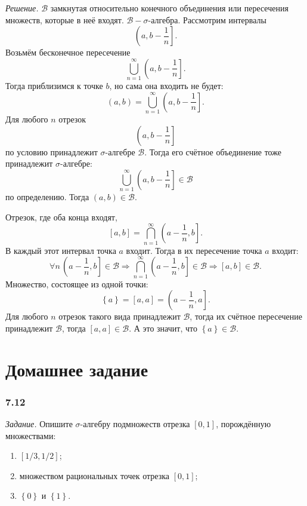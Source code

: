 \textit{Решение.} $ \mathcal{B} $ замкнутая относительно конечного объединения или пересечения множеств, которые в неё входят.
$ \mathcal{B} - \sigma $-алгебра.
Рассмотрим интервалы
$$ \left( a, b - \frac{1}{n} \right].$$
Возьмём бесконечное пересечение
$$ \bigcup \limits_{n=1}^{ \infty } \left( a, b - \frac{1}{n} \right].$$
Тогда приблизимся к точке $b$, но сама она входить не будет:
$$ \left( a, b \right) =
\bigcup \limits_{n=1}^{ \infty } \left( a, b - \frac{1}{n} \right].$$
Для любого $n$ отрезок
$$ \left( a, b - \frac{1}{n} \right] $$
по условию принадлежит $ \sigma $-алгебре $ \mathcal{B}$.
Тогда его счётное объединение тоже принадлежит $ \sigma $-алгебре:
$$ \bigcup \limits_{n=1}^{ \infty } \left( a, b - \frac{1}{n} \right] \in \mathcal{B} $$
по определению.
Тогда $ \left( a, b \right) \in \mathcal{B} $.

Отрезок, где оба конца входят,
$$ \left[ a, b \right] =
\bigcap \limits_{n=1}^{ \infty } \left( a - \frac{1}{n}, b \right].$$
В каждый этот интервал точка $a$ входит.
Тогда в их пересечение точка $a$ входит:
$$ \forall n \,
\left( a - \frac{1}{n}, b \right] \in \mathcal{B} \Rightarrow
\bigcap \limits_{n=1}^{ \infty } \left( a - \frac{1}{n}, b \right] \in \mathcal{B} \Rightarrow
\left[ a, b \right] \in \mathcal{B}.$$
Множество, состоящее из одной точки:
$$ \left\{ a \right\} =
\left[ a, a \right] =
\left( a - \frac{1}{n}, a \right].$$
Для любого $n$ отрезок такого вида принадлежит $ \mathcal{B} $, тогда их счётное пересечение принадлежит $ \mathcal{B} $, тогда $ \left[ a, a \right] \in \mathcal{B} $.
А это значит, что $ \left\{ a \right\} \in \mathcal{B} $.

\section*{Домашнее задание}

\subsubsection*{7.12}

\textit{Задание.} Опишите $ \sigma $-алгебру подмножеств отрезка $ \left[ 0, 1 \right] $, порождённую множествами:
\begin{enumerate}[label=\alph*)]
\item $ \left[ 1/3, 1/2 \right] $;
\item множеством рациональных точек отрезка $ \left[ 0, 1 \right] $;
\item $ \left\{ 0 \right\} $ и $ \left\{ 1 \right\} $.
\end{enumerate}


